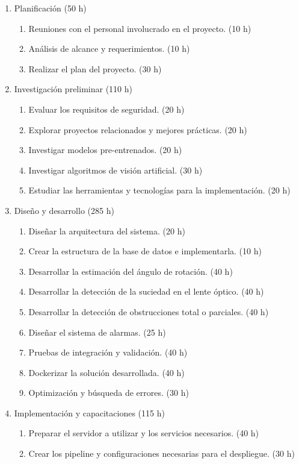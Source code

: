 \documentclass[
11pt, %
]{charter}
\begin{document}
\begin{enumerate}
\item Planificación (50 h)
	\begin{enumerate}
	\item Reuniones con el personal involucrado en el proyecto. (10 h)
	\item Análisis de alcance y requerimientos. (10 h)
	\item Realizar el plan del proyecto. (30 h)
	\end{enumerate}
\item Investigación preliminar (110 h)
	\begin{enumerate}
	\item Evaluar los requisitos de seguridad. (20 h)
	\item Explorar proyectos relacionados y mejores prácticas. (20 h)
	\item Investigar modelos pre-entrenados. (20 h)
	\item Investigar algoritmos de visión artificial. (30 h) 
	\item Estudiar las herramientas y tecnologías para la implementación. (20 h)
	\end{enumerate}
\item Diseño y desarrollo (285 h)
	\begin{enumerate}
	\item Diseñar la arquitectura del sistema. (20 h)
	\item Crear la estructura de la base de datos e implementarla. (10 h)
	\item Desarrollar la estimación del ángulo de rotación. (40 h)
	\item Desarrollar la detección de la suciedad en el lente óptico. (40 h)
	\item Desarrollar la detección de obstrucciones total o parciales. (40 h)
	\item Diseñar el sistema de alarmas. (25 h)
	\item Pruebas de integración y validación. (40 h)
	\item Dockerizar la solución desarrollada. (40 h)
	\item Optimización y búsqueda de errores. (30 h)
	\end{enumerate}
\item Implementación y capacitaciones (115 h)
	\begin{enumerate}
	\item Preparar el servidor a utilizar y los servicios necesarios. (40 h)
	\item Crear los pipeline y configuraciones necesarias para el despliegue. (30 h)

\end{enumerate}
\end{enumerate}
\end{document}
